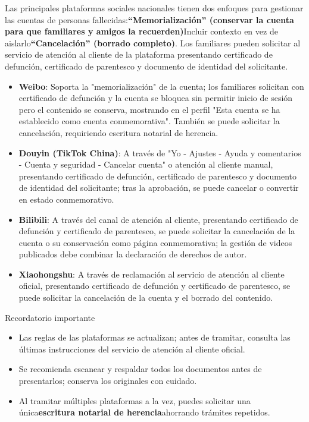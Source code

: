 
Las principales plataformas sociales nacionales tienen dos enfoques para gestionar las cuentas de personas fallecidas:\textbf{“Memorialización” (conservar la cuenta para que familiares y amigos la recuerden)}Incluir contexto en vez de aislarlo\textbf{“Cancelación” (borrado completo)}. Los familiares pueden solicitar al servicio de atención al cliente de la plataforma presentando certificado de defunción, certificado de parentesco y documento de identidad del solicitante.

\begin{itemize}
  \item \textbf{Weibo}: Soporta la "memorialización" de la cuenta; los familiares solicitan con certificado de defunción y la cuenta se bloquea sin permitir inicio de sesión pero el contenido se conserva, mostrando en el perfil "Esta cuenta se ha establecido como cuenta conmemorativa". También se puede solicitar la cancelación, requiriendo escritura notarial de herencia.
  \item \textbf{Douyin (TikTok China)}: A través de "Yo - Ajustes - Ayuda y comentarios - Cuenta y seguridad - Cancelar cuenta" o atención al cliente manual, presentando certificado de defunción, certificado de parentesco y documento de identidad del solicitante; tras la aprobación, se puede cancelar o convertir en estado conmemorativo.
  \item \textbf{Bilibili}: A través del canal de atención al cliente, presentando certificado de defunción y certificado de parentesco, se puede solicitar la cancelación de la cuenta o su conservación como página conmemorativa; la gestión de videos publicados debe combinar la declaración de derechos de autor.
  \item \textbf{Xiaohongshu}: A través de reclamación al servicio de atención al cliente oficial, presentando certificado de defunción y certificado de parentesco, se puede solicitar la cancelación de la cuenta y el borrado del contenido.
\end{itemize}

\begin{tcbinfo}{Recordatorio importante}
\begin{itemize}
  \item Las reglas de las plataformas se actualizan; antes de tramitar, consulta las últimas instrucciones del servicio de atención al cliente oficial.
  \item Se recomienda escanear y respaldar todos los documentos antes de presentarlos; conserva los originales con cuidado.
  \item Al tramitar múltiples plataformas a la vez, puedes solicitar una única\textbf{escritura notarial de herencia}ahorrando trámites repetidos.
\end{itemize}

\end{tcbinfo}

